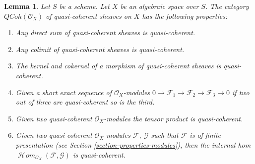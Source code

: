 \documentclass[10pt,a4paper]{amsart}
\theoremstyle{plain}
\newtheorem{lemma}[subsection]{Lemma}
\theoremstyle{definition}
\theoremstyle{remark}
\numberwithin{equation}{subsection}
\def\SheafHom{\mathop{\mathcal{H}\!\mathit{om}}\nolimits}
\def\QCoh{\mathit{QCoh}}
\begin{document}
\begin{lemma}
\label{lemma-properties-quasi-coherent}
Let $S$ be a scheme. Let $X$ be an algebraic space over $S$.
The category $\QCoh(\mathcal{O}_X)$ of quasi-coherent sheaves on $X$
has the following properties:
\begin{enumerate}
\item Any direct sum of quasi-coherent sheaves is quasi-coherent.
\item Any colimit of quasi-coherent sheaves is quasi-coherent.
\item The kernel and cokernel of a morphism of quasi-coherent sheaves
is quasi-coherent.
\item Given a short exact sequence of $\mathcal{O}_X$-modules
$0 \to \mathcal{F}_1 \to \mathcal{F}_2 \to \mathcal{F}_3 \to 0$
if two out of three are quasi-coherent so is the third.
\item Given two quasi-coherent $\mathcal{O}_X$-modules
the tensor product is quasi-coherent.
\item Given two quasi-coherent $\mathcal{O}_X$-modules
$\mathcal{F}$, $\mathcal{G}$ such that $\mathcal{F}$
is of finite presentation (see
Section \ref{section-properties-modules}),
then the internal hom
$\SheafHom_{\mathcal{O}_X}(\mathcal{F}, \mathcal{G})$
is quasi-coherent.
\end{enumerate}
\end{lemma}
\end{document}
